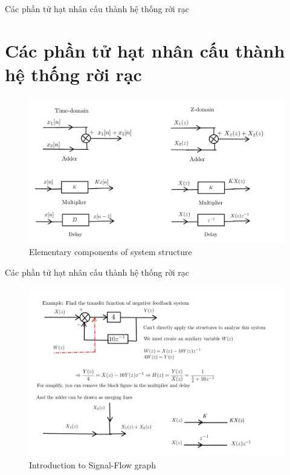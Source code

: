 \documentclass[8pt]{beamer}
\begin{document}
\begin{frame}{Các phần tử hạt nhân cấu thành hệ thống rời rạc}
\section{Các phần tử hạt nhân cấu thành hệ thống rời rạc}
\begin{figure}[h]
			\includegraphics[width=1.1\textwidth]{2.jpg}
			\caption{Elementary components of system structure}			\label{fig:re2}
		\end{figure}
\end{frame}
\begin{frame}{Các phần tử hạt nhân cấu thành hệ thống rời rạc}
\begin{figure}[h]
			\includegraphics[width=1\textwidth]{3.jpg}
			\caption{Introduction to Signal-Flow graph}			\label{fig:re3}

		\end{figure}
\end{frame}
\end{document}
